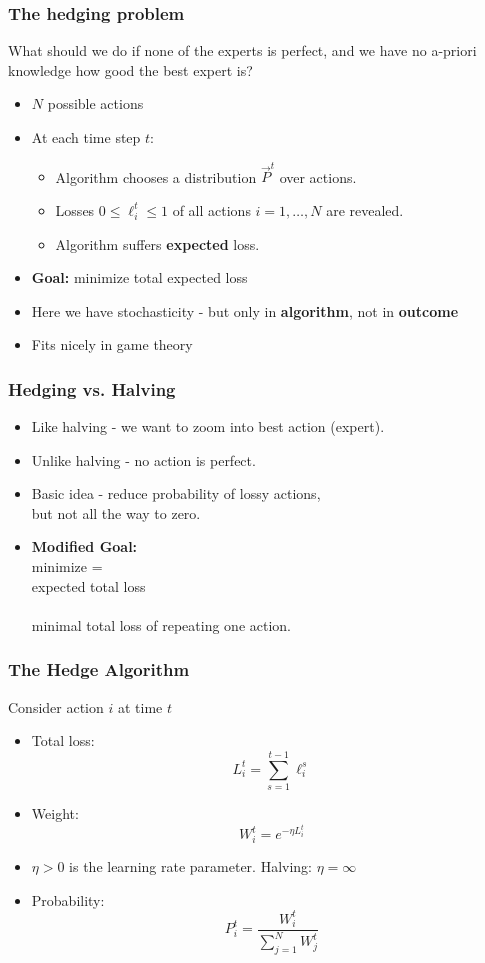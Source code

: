\documentclass{beamer}
\begin{document}
\begin{frame}
\frametitle{The hedging problem}

What should we do if none of the experts is perfect, and we have no
a-priori knowledge how good the best expert is?
\begin{itemize}
\item $N$ possible actions 

\item At each time step $t$:
\begin{itemize}
\item Algorithm chooses a distribution $\vec{P}^t$ over actions.
\item Losses $0 \leq \ell_i^t \leq 1$ of all actions $i=1,\ldots,N$ are revealed.
\item Algorithm suffers {\bf expected} loss.
\end{itemize}
\item {{\bf Goal:} minimize total expected loss}
\item {Here we have stochasticity - but only in {\bf algorithm}, not in {\bf outcome}}
\item {Fits nicely in game theory}
\end{itemize}
\end{frame}

\begin{frame}
\frametitle{Hedging vs. Halving}
\begin{itemize}
\item Like halving - we want to zoom into best action (expert).
\item Unlike halving - no action is perfect.
\item Basic idea - reduce probability of lossy actions, \\
but {\color{red}not all the way to zero}.
\item {\bf Modified Goal:}\\
minimize {\color{red}{REGRET}} = \\
expected total loss \\
{\color{red}{minus}} \\
minimal total loss of repeating one action.
\end{itemize}
\end{frame}

\begin{frame}
\frametitle{The Hedge Algorithm}
Consider action $i$ at time $t$
\begin{itemize}
\item Total loss:
$$L_i^t = \sum_{s=1}^{t-1} \ell_i^s$$
\item Weight:
$$W_i^t = e^{-\eta L_i^t}$$
\item
$\eta>0$ is the learning rate parameter. Halving: $\eta=\infty$ 
\item Probability:
$$P_i^t = \frac{W_i^t}{\sum_{j=1}^N W_j^t} $$
\end{itemize}
\end{frame}
\end{document}
